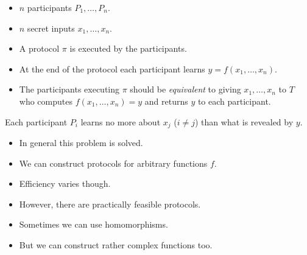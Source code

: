 \begin{frame}
  \begin{definition}
    \begin{itemize}
      \item \(n\) participants \(P_1, \ldots, P_n\).
      \item \(n\) secret inputs \(x_1, \ldots, x_n\).

        \pause{}

      \item A protocol \(\pi\) is executed by the participants.
      \item At the end of the protocol each participant learns \(y = f(x_1, 
          \ldots, x_n)\).

        \pause{}

      \item The participants executing \(\pi\) should be \emph{equivalent} to 
        giving \(x_1, \ldots, x_n\) to  \(T\) who computes \(f(x_1, 
          \ldots, x_n) = y\) and returns \(y\) to each participant.
    \end{itemize}
  \end{definition}

  \pause{}

  \begin{remark}
    Each participant \(P_i\) learns no more about \(x_j\) (\(i\neq j\))
    than what is revealed by \(y\).
  \end{remark}
\end{frame}

\begin{frame}
  \begin{itemize}
    \item In general this problem is solved.
    \item We can construct protocols for arbitrary functions \(f\).

      \pause{}

    \item Efficiency varies though.
    \item However, there are practically feasible protocols.

      \pause{}

    \item Sometimes we can use homomorphisms.
    \item But we can construct rather complex functions too.
  \end{itemize}
\end{frame}

